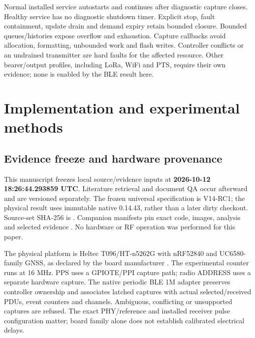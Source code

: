 \documentclass[11pt,letterpaper]{article}
\begin{document}
Normal installed service autostarts and continues after diagnostic capture closes. Healthy service has no diagnostic shutdown timer. Explicit stop, fault containment, update drain and demand expiry retain bounded closure. Bounded queues/histories expose overflow and exhaustion. Capture callbacks avoid allocation, formatting, unbounded work and flash writes. Controller conflicts or an undrained transmitter are hard faults for the affected resource. Other bearer/output profiles, including LoRa, WiFi and PTS, require their own evidence; none is enabled by the BLE result here.

\section{Implementation and experimental methods}\label{sec:methods}
\subsection{Evidence freeze and hardware provenance}
This manuscript freezes local source/evidence inputs at \textbf{2026-10-12 18:26:44.293859 UTC}. Literature retrieval and document QA occur afterward and are versioned separately. The frozen universal specification is V14-RC1; the physical result uses immutable native 0.14.43, rather than a later dirty checkout. Source-set SHA-256 is . Companion manifests pin exact code, images, analysis and selected evidence \cite{evidence}. No hardware or RF operation was performed for this paper.

The physical platform is Heltec T096/HT-n5262G with nRF52840 and UC6580-family GNSS, as declared by the board manufacturer \cite{heltec}. The experimental counter runs at 16 MHz. PPS uses a GPIOTE/PPI capture path; radio ADDRESS uses a separate hardware capture. The native periodic BLE 1M adapter preserves controller ownership and associates latched captures with actual selected/received PDUs, event counters and channels. Ambiguous, conflicting or unsupported captures are refused. The exact PHY/reference and installed receiver pulse configuration matter; board family alone does not establish calibrated electrical delays.
\end{document}
